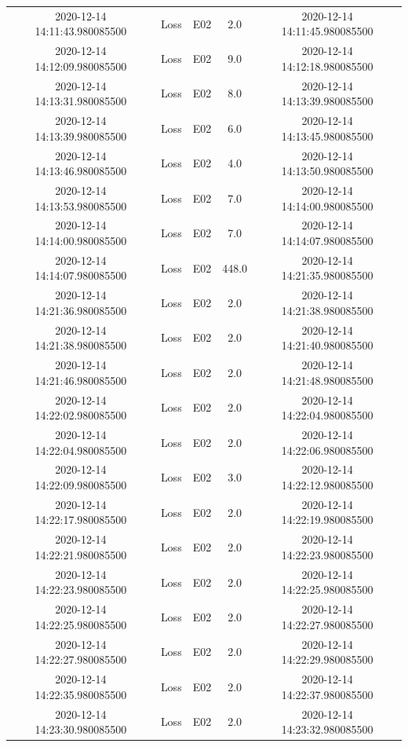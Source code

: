 \begin{enumerate}
\begin{longtabu}{ccccc}
2020{-}12{-}14 14:11:43.980085500&Loss&E02&2.0&2020{-}12{-}14 14:11:45.980085500\\%
2020{-}12{-}14 14:12:09.980085500&Loss&E02&9.0&2020{-}12{-}14 14:12:18.980085500\\%
2020{-}12{-}14 14:13:31.980085500&Loss&E02&8.0&2020{-}12{-}14 14:13:39.980085500\\%
2020{-}12{-}14 14:13:39.980085500&Loss&E02&6.0&2020{-}12{-}14 14:13:45.980085500\\%
2020{-}12{-}14 14:13:46.980085500&Loss&E02&4.0&2020{-}12{-}14 14:13:50.980085500\\%
2020{-}12{-}14 14:13:53.980085500&Loss&E02&7.0&2020{-}12{-}14 14:14:00.980085500\\%
2020{-}12{-}14 14:14:00.980085500&Loss&E02&7.0&2020{-}12{-}14 14:14:07.980085500\\%
2020{-}12{-}14 14:14:07.980085500&Loss&E02&448.0&2020{-}12{-}14 14:21:35.980085500\\%
2020{-}12{-}14 14:21:36.980085500&Loss&E02&2.0&2020{-}12{-}14 14:21:38.980085500\\%
2020{-}12{-}14 14:21:38.980085500&Loss&E02&2.0&2020{-}12{-}14 14:21:40.980085500\\%
2020{-}12{-}14 14:21:46.980085500&Loss&E02&2.0&2020{-}12{-}14 14:21:48.980085500\\%
2020{-}12{-}14 14:22:02.980085500&Loss&E02&2.0&2020{-}12{-}14 14:22:04.980085500\\%
2020{-}12{-}14 14:22:04.980085500&Loss&E02&2.0&2020{-}12{-}14 14:22:06.980085500\\%
2020{-}12{-}14 14:22:09.980085500&Loss&E02&3.0&2020{-}12{-}14 14:22:12.980085500\\%
2020{-}12{-}14 14:22:17.980085500&Loss&E02&2.0&2020{-}12{-}14 14:22:19.980085500\\%
2020{-}12{-}14 14:22:21.980085500&Loss&E02&2.0&2020{-}12{-}14 14:22:23.980085500\\%
2020{-}12{-}14 14:22:23.980085500&Loss&E02&2.0&2020{-}12{-}14 14:22:25.980085500\\%
2020{-}12{-}14 14:22:25.980085500&Loss&E02&2.0&2020{-}12{-}14 14:22:27.980085500\\%
2020{-}12{-}14 14:22:27.980085500&Loss&E02&2.0&2020{-}12{-}14 14:22:29.980085500\\%
2020{-}12{-}14 14:22:35.980085500&Loss&E02&2.0&2020{-}12{-}14 14:22:37.980085500\\%
2020{-}12{-}14 14:23:30.980085500&Loss&E02&2.0&2020{-}12{-}14 14:23:32.980085500\\%

\end{longtabu}
\end{enumerate}
